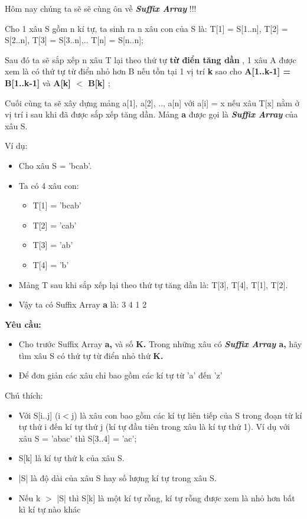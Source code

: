 Hôm nay chúng ta sẽ sẽ cùng ôn về   \emph{\textbf{     Suffix Array    }}   !!!  

   Cho 1 xâu S gồm n kí tự, ta sinh ra n xâu con của S là: T[1] = S[1..n], T[2] = S[2..n], T[3] = S[3..n],.. T[n] = S[n..n];  

   Sau đó ta sẽ sắp xếp n xâu T lại theo thứ tự   \textbf{    từ điển tăng dần   }   , 1 xâu A được xem là có thứ tự từ điển nhỏ hơn B nếu tồn tại 1 vị trí   \textbf{    k   }   sao cho   \textbf{    A[1..k-1] = B[1..k-1]   }   và   \textbf{    A[k] $<$ B[k]   }   ;  

   Cuối cùng ta sẽ xây dựng mảng a[1], a[2], .., a[n] với a[i] = x nếu xâu T[x] nằm ở vị trí i sau khi đã được sắp xếp tăng dần. Mảng   \textbf{    a   }   được gọi là   \emph{\textbf{     Suffix Array    }}   của xâu S.  

   Ví dụ:  
\begin{itemize}
	\item     Cho xâu S = 'bcab'.   
	\item     Ta có 4 xâu con:    
\begin{itemize}
	\item       T[1] = 'bcab'     
	\item       T[2] = 'cab'     
	\item       T[3] = 'ab'     
	\item       T[4] = 'b'     
\end{itemize}
	\item     Mảng T sau khi sắp xếp lại theo thứ tự tăng dần là: T[3], T[4], T[1], T[2].   
	\item     Vậy ta có Suffix Array    \textbf{     a    }    là: 3 4 1 2   
\end{itemize}
\begin{enumerate}
\end{enumerate}

\textbf{    Yêu cầu:   }
\begin{itemize}
	\item     Cho trước Suffix Array    \textbf{     a,    }    và số    \textbf{     K.    }    Trong những xâu có    \textbf{\emph{      Suffix Array     }     a,    }    hãy tìm xâu S có thứ tự từ điển nhỏ thứ    \textbf{     K.    }
	\item     Để đơn giản các xâu chỉ bao gồm các kí tự từ 'a' đến 'z'   
\end{itemize}

   Chú thích:  
\begin{itemize}
	\item     Với S[i..j] (i$<$j) là xâu con bao gồm các kí tự liên tiếp của S trong đoạn từ kí tự thứ i đến kí tự thứ j (kí tự đầu tiên trong xâu là kí tự thứ 1). Ví dụ với xâu S = 'abac' thì S[3..4] = 'ac';   
	\item     S[k] là kí tự thứ k của xâu S.   
	\item     |S| là độ dài của xâu S hay số lượng kí tự trong xâu S.   
	\item     Nếu k $>$ |S| thì S[k] là một kí tự rỗng, kí tự rỗng được xem là nhỏ hơn bất kì kí tự nào khác   
\end{itemize}